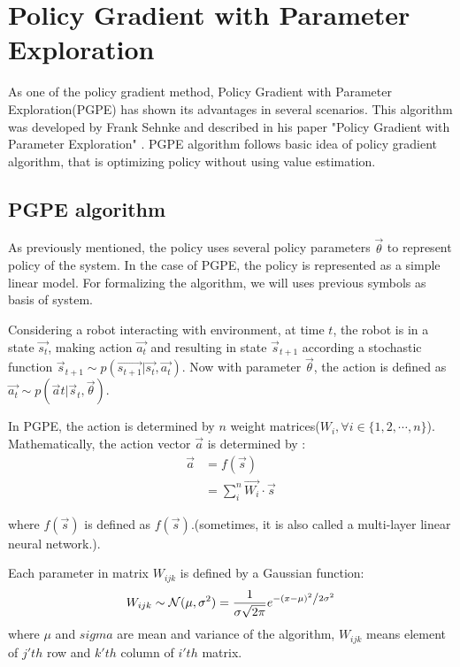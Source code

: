 \documentclass[officiallayout]{tktla}
\begin{document}
\section{Policy Gradient with Parameter Exploration}
As one of the policy gradient method, Policy Gradient with Parameter Exploration(PGPE) has shown its advantages in several scenarios. This algorithm was developed by Frank Sehnke and described in his paper "Policy Gradient with Parameter Exploration" \cite{sehnke2008policy}. PGPE algorithm follows basic idea of policy gradient algorithm, that is optimizing policy without using value estimation.

\subsection{PGPE algorithm}
As previously mentioned, the policy uses several policy parameters $\vec{\theta}$ to represent policy of the system. In the case of PGPE, the policy is represented as a simple linear model. For formalizing the algorithm, we will uses previous symbols as basis of system.

Considering a robot interacting with environment, at time $t$, the robot is in a state $\vec{s_t}$, making action $\vec{a_t}$ and resulting in state $\vec{s}_{t+1}$ according a stochastic function $\vec{s}_{t+1}\sim p(\vec{s_{t+1}}|\vec{s_t}, \vec{a_t})$. Now with parameter $\vec{\theta}$, the action is defined as $ \vec{a_{t}}\sim p(\vec{a}{t}|\vec{s}_{t},\vec{\theta})$.

In PGPE, the action is determined by $n$ weight matrices($W_i, \forall i \in \{1,2,\cdots, n\}$). Mathematically, the action vector $\vec{a}$ is determined by :
\begin{align}
\vec{a} &= f(\vec{s}) \\
&= \sum_i^n\vec{W_i} \cdot \vec{s}
\end{align}

where $f(\vec{s})$ is defined as $f(\vec{s})$.(sometimes, it is also called a multi-layer linear neural network.).

Each parameter in matrix $W_{ijk}$ is defined by a Gaussian function:
\begin{equation}
W_{ijk} \sim \mathcal{N}(\mu, \sigma^2) = \frac{1}{{\sigma \sqrt {2\pi } }}e^{{{ - \left( {x - \mu } \right)^2 } \mathord{\left/ {\vphantom {{ - \left( {x - \mu } \right)^2 } {2\sigma ^2 }}} \right. \kern-\nulldelimiterspace} {2\sigma ^2 }}}
\label{pgpe_gaussian}
\end{equation}
where $\mu$ and $sigma$ are mean and variance of the algorithm, $W_{ijk}$ means element of $j'th$ row and $k'th$ column of $i'th$ matrix.
\end{document}
